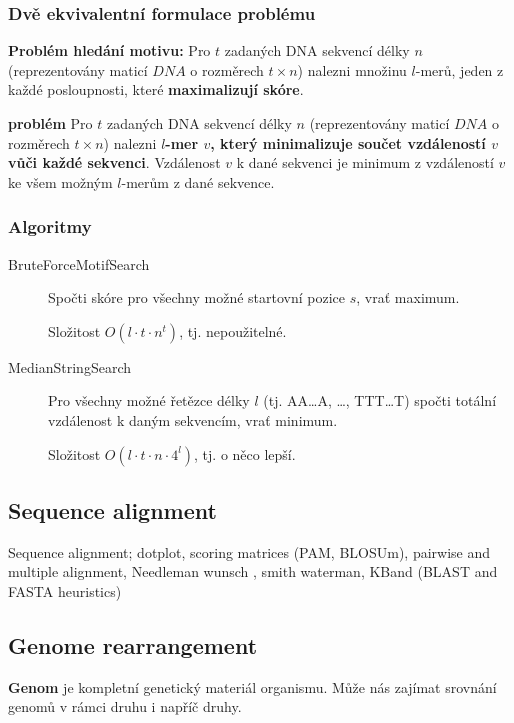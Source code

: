 \documentclass[11pt]{report} %
\numberwithin{equation}{section}
\begin{document}
\subsubsection{Dvě ekvivalentní formulace problému}

\textbf{Problém hledání motivu:} Pro $t$ zadaných DNA sekvencí délky $n$ (reprezentovány maticí $DNA$ o rozměrech $t\times n$) nalezni množinu $l$-merů, jeden z každé posloupnosti, které \textbf{maximalizují skóre}.

\textbf{ problém} Pro $t$ zadaných DNA sekvencí délky $n$ (reprezentovány maticí $DNA$ o rozměrech $t\times n$) nalezni \textbf{$l$-mer $v$, který minimalizuje součet vzdáleností $v$ vůči každé sekvenci}. Vzdálenost $v$ k dané sekvenci je minimum z vzdáleností $v$ ke všem možným $l$-merům z dané sekvence.

\subsubsection{Algoritmy}
\begin{description}
	\item[BruteForceMotifSearch] Spočti skóre pro všechny možné startovní pozice $s$, vrať maximum. 
	
	Složitost $O(l\cdot t \cdot n^t)$, tj. nepoužitelné.
	
	\item[MedianStringSearch] Pro všechny možné řetězce délky $l$ (tj. AA\dots A, \dots, TTT\dots T) spočti totální vzdálenost k daným sekvencím, vrať minimum.
	
	Složitost $O(l\cdot t \cdot n \cdot 4^l)$, tj. o něco lepší.
\end{description}




\subsection{Sequence alignment}
Sequence alignment; dotplot, scoring matrices (PAM, BLOSUm), pairwise and multiple alignment, Needleman wunsch , smith waterman, KBand
(BLAST and FASTA heuristics)

\subsection{Genome rearrangement}
\textbf{Genom} je kompletní genetický materiál organismu. Může nás zajímat srovnání genomů v rámci druhu i napříč druhy.
\end{document}
